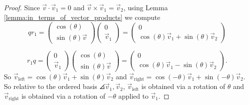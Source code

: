 \documentclass[oneside,12pt]{amsart}
\begin{document}
\begin{proof}
Since $\vec{v} \cdot \vec{v}_1 = 0$ and
$\vec{v} \times \vec{v}_1 = \vec{v}_2$,
using Lemma \ref{lemma:in_terms_of_vector_products} we compute
$$
q  r_1   =
\begin{pmatrix}
\cos(\theta) \\ \sin(\theta) \vec{v}
\end{pmatrix}
\begin{pmatrix}
0 \\ \vec{v}_1
\end{pmatrix}
 =
\begin{pmatrix}
0 \\ \cos(\theta)\vec{v}_1 + \sin(\theta)\vec{v}_2
\end{pmatrix}
$$

$$
r_1 q  =
\begin{pmatrix}
0 \\ \vec{v}_1
\end{pmatrix}
\begin{pmatrix}
\cos(\theta) \\ \sin(\theta) \vec{v}
\end{pmatrix}
 =
\begin{pmatrix}
0 \\ \cos(\theta)\vec{v}_1 - \sin(\theta)\vec{v}_2
\end{pmatrix}.
$$
So $\vec{v}_{\text{left}} = \cos(\theta)\vec{v}_1 + \sin(\theta)\vec{v}_2$ and
$\vec{v}_{\text{right}} = \cos(-\theta)\vec{v}_1 + \sin(-\theta)\vec{v}_2$.
So relative to the ordered basis $\angles{\vec{v}_1,\vec{v}_2}$, $\vec{v}_{\text{left}}$ is obtained
via a rotation of $\theta$ and $\vec{v}_{\text{right}}$ is obtained via a rotation
of $-\theta$ applied to $\vec{v}_1$.
\end{proof}
\end{document}

